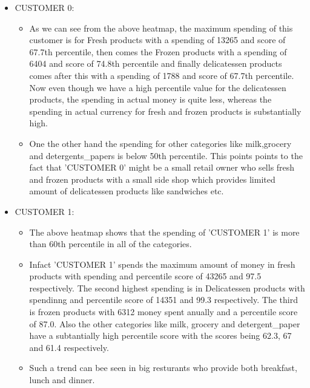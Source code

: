 \documentclass[11pt]{article}
\providecommand{\tightlist}{%
      \setlength{\itemsep}{0pt}\setlength{\parskip}{0pt}}
\begin{document}
\begin{itemize}
\item
  CUSTOMER 0:

  \begin{itemize}
  \tightlist
  \item
    As we can see from the above heatmap, the maximum spending of this
    customer is for Fresh products with a spending of 13265 and score of
    67.7th percentile, then comes the Frozen products with a spending of
    6404 and score of 74.8th percentile and finally delicatessen
    products comes after this with a spending of 1788 and score of
    67.7th percentile. Now even though we have a high percentile value
    for the delicatessen products, the spending in actual money is quite
    less, whereas the spending in actual currency for fresh and frozen
    products is substantially high.
  \item
    One the other hand the spending for other categories like
    milk,grocery and detergents\_papers is below 50th percentile. This
    points points to the fact that 'CUSTOMER 0' might be a small retail
    owner who sells fresh and frozen products with a small side shop
    which provides limited amount of delicatessen products like
    sandwiches etc.
  \end{itemize}
\item
  CUSTOMER 1:

  \begin{itemize}
  \tightlist
  \item
    The above heatmap shows that the spending of 'CUSTOMER 1' is more
    than 60th percentile in all of the categories.
  \item
    Infact 'CUSTOMER 1' spends the maximum amount of money in fresh
    products with spending and percentile score of 43265 and 97.5
    respectively. The second highest spending is in Delicatessen
    products with spendinng and percentile score of 14351 and 99.3
    respectively. The third is frozen products with 6312 money spent
    anually and a percentile score of 87.0. Also the other categories
    like milk, grocery and detergent\_paper have a subtantially high
    percentile score with the scores being 62.3, 67 and 61.4
    respectively.
  \item
    Such a trend can bee seen in big resturants who provide both
    breakfast, lunch and dinner.


\end{itemize}
\end{itemize}
\end{document}
